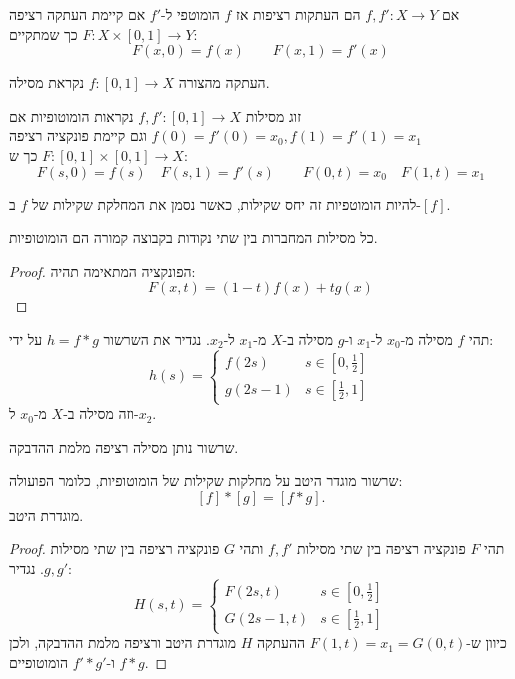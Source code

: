 \documentclass{tstextbook}
\begin{document}
\begin{definition}[הומוטופיה]
אם \(f,f':X\to Y\) הם העתקות רציפות אז \(f\) הומוטפי ל-\(f'\) אם קיימת העתקה רציפה \(F:X\times[0,1]\to Y\) כך שמתקיים:
$$F(x,0)=f(x)\qquad F(x,1)=f'(x)$$

\end{definition}
\begin{definition}[מסילה]
העתקה מהצורה \(f:[0,1]\to X\) נקראת מסילה.

\end{definition}
\begin{definition}
זוג מסילות \(f,f':[0,1]\to X\) נקראות הומוטופיות אם \(f(0)=f'(0)=x_{0},f(1)=f'(1)=x_{1}\) וגם קיימת פונקציה רציפה \(F:[0,1]\times[0,1]\to X\) כך ש:
$$F(s,0)=f(s)\quad F(s,1)=f'(s)\qquad F(0,t)=x_{0}\quad F(1,t)=x_{1}$$

\end{definition}
\begin{proposition}
להיות הומוטפיות זה יחס שקילות, כאשר נסמן את המחלקת שקילות של \(f\) ב-\([f]\).

\end{proposition}
\begin{proposition}
כל מסילות המחברות בין שתי נקודות בקבוצה קמורה הם הומוטופיות.

\end{proposition}
\begin{proof}
הפונקציה המתאימה תהיה:
$$F(x,t)=(1-t)f(x)+t g(x)$$

\end{proof}
\begin{definition}[שרשרור]
תהי \(f\) מסילה מ-\(x_{0}\) ל-\(x_{1}\) ו-\(g\) מסילה ב-\(X\) מ-\(x_{1}\) ל-\(x_{2}\). נגדיר את השרשור \(h=f*g\) על ידי:
$$h(s)=\begin{cases}f(2s) & s \in \left[ 0,\frac{1}{2} \right] \\g(2s-1) & s \in \left[ \frac{1}{2},1 \right]
\end{cases}$$
וזה מסילה ב-\(X\) מ-\(x_{0}\) ל-\(x_{2}\).

\end{definition}
\begin{remark}
שרשור נותן מסילה רציפה מלמת ההדבקה.

\end{remark}
\begin{proposition}
שרשור מוגדר היטב על מחלקות שקילות של הומוטופיות, כלומר הפועולה:
$$[f]\ast[g]=[f\ast g].$$
מוגדרת היטב.

\end{proposition}
\begin{proof}
תהי \(F\) פונקציה רציפה בין שתי מסילות \(f,f'\) ותהי \(G\) פונקציה רציפה בין שתי מסילות \(g,g'\). נגדיר:
$$H(s,t)=\begin{cases}F(2s,t) & s \in \left[ 0,\frac{1}{2} \right] \\G(2s-1,t) & s \in \left[ \frac{1}{2},1 \right]
\end{cases}$$
כיוון ש-\(F(1,t)=x_{1}=G(0,t)\) ההעתקה \(H\) מוגדרת היטב ורציפה מלמת ההדבקה, ולכן \(f*g\) ו-\(f'*g'\) הומוטופיים.

\end{proof}
\end{document}
